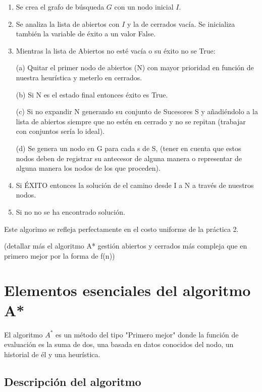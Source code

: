 \documentclass[12 pt, a4paper]{article}
\begin{document}
\begin{enumerate}
  \item Se crea el grafo de búsqueda $G$ con un nodo inicial $I.$
  \item Se analiza la lista de abiertos con $I$ y la de cerrados vacía. Se inicializa también la variable de éxito a un valor False.
  \item Mientras la lista de Abiertos no esté vacía o su éxito no se True: 
  
   (a) Quitar el primer nodo de abiertos (N) con mayor prioridad en función de nuestra heurística
   y meterlo en cerrados.


   (b) Si N es el estado final entonces éxito es True.


   (c)  Si no expandir N generando su conjunto de Sucesores S y añadiéndolo a la lista de abiertos
    siempre que no estén en cerrado y no se repitan (trabajar con conjuntos sería lo ideal).


    (d) Se genera un nodo en G para cada s de S, (tener en cuenta que estos nodos deben de registrar su antecesor de alguna manera
    o representar de alguna manera los nodos de los que proceden).

      \item Si ÉXITO entonces la solución de el camino desde I a N a través de nuestros nodos. 
      \item Si no no se ha encontrado solución. 
      
  
\end{enumerate}

Este algorimo se refleja perfectamente en el costo uniforme de la práctica 2. 

\newpage
(detallar más el algoritmo A* gestión abiertos y cerrados más compleja que en primero mejor por la forma de f(n))
\section{Elementos esenciales del algoritmo A*}

El algoritmo $A^*$ es un método del tipo "Primero mejor" donde la función de evaluación es la suma 
de dos, una basada en datos conocidos del nodo, un historial de él y una heurística. 

\subsection*{Descripción del algoritmo}  
\end{document}

